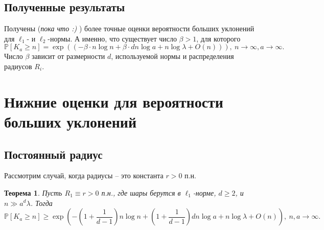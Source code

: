 \documentclass[12pt]{article}
\theoremstyle{plain}
\newtheorem{thm}{Теорема} %
\theoremstyle{definition}
\theoremstyle{remark}
\def\geq{\geqslant}
\newcommand{\cuplim}{\bigcup\limits}
\newcommand{\R}{\mathbb{R}}
\newcommand{\PP}{\mathbb{P}}
\newcommand{\til}{\widetilde}
\begin{document}
\subsection{Полученные результаты}
Получены ({\it пока что :)} ) более точные оценки вероятности больших уклонений для $\ell_1$- и $\ell_2$-нормы. А именно, что существует число $\beta >1$, для которого $$\PP[K_a \geq n] = \exp((-\beta\cdot n\log n + \beta\cdot dn\log a + n\log\lambda + O(n))), \ n\to \infty, a \to\infty.$$
Число $\beta$ зависит от размерности $d$, используемой нормы и распределения радиусов $R_i$.



%
%
%

\section{Нижние оценки для вероятности больших уклонений}

\subsection{Постоянный радиус}

Рассмотрим случай, когда радиусы -- это константа $r>0$ п.н. 

\begin{thm}
Пусть $R_1\equiv r > 0$ п.н., где шары берутся в $\ell_1$-норме, $d\geq 2$, и $n \gg a^d\lambda$. 
Тогда $$\PP[K_a \geq n] \geq \exp \left(-\left(1+\dfrac{1}{d-1}\right)n\log n + \left(1+\dfrac{1}{d-1}\right)dn\log a  + n\log\lambda + O(n)\right),\  n, a\to \infty.$$
\end{thm}{}
\end{document}

